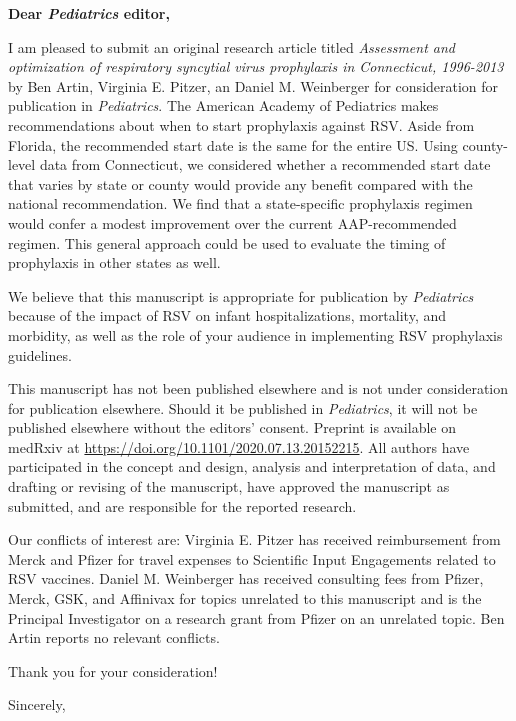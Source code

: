 \documentclass[10pt]{letter} %
\begin{document}

\begin{letter}{} %


\opening{\textbf{Dear \textit{Pediatrics} editor,}}

I am pleased to submit an original research article titled \textit{Assessment and optimization of respiratory syncytial virus prophylaxis in Connecticut, 1996-2013} by Ben Artin, Virginia E. Pitzer, an Daniel M. Weinberger for consideration for publication in \textit{Pediatrics}. The American Academy of Pediatrics makes recommendations about when to start prophylaxis against RSV. Aside from Florida, the recommended start date is the same for the entire US. Using county-level data from Connecticut, we considered whether a recommended start date that varies by state or county would provide any benefit compared with the national recommendation. We find that a state-specific prophylaxis regimen would confer a modest improvement over the current AAP-recommended regimen. This general approach could be used to evaluate the timing of prophylaxis in other states as well.

We believe that this manuscript is appropriate for publication by \textit{Pediatrics} because of the impact of RSV on infant hospitalizations, mortality, and morbidity, as well as the role of your audience in implementing RSV prophylaxis guidelines. 

This manuscript has not been published elsewhere and is not under consideration for publication elsewhere. Should it be published in \textit{Pediatrics}, it will not be published elsewhere without the editors' consent. Preprint is available on medRxiv at \url{https://doi.org/10.1101/2020.07.13.20152215}. All authors have participated in the concept and design, analysis and interpretation of data, and drafting or revising of the manuscript, have approved the manuscript as submitted, and are responsible for the reported research.

Our conflicts of interest are: Virginia E. Pitzer has received reimbursement from Merck and Pfizer for travel expenses to Scientific Input Engagements related to RSV vaccines. Daniel M. Weinberger has received consulting fees from Pfizer, Merck, GSK, and Affinivax for topics unrelated to this manuscript and is the Principal Investigator on a research grant from Pfizer on an unrelated topic. Ben Artin reports no relevant conflicts.

Thank you for your consideration!

\vspace{2\parskip} %
\closing{Sincerely,}
\vspace{2\parskip} %


\end{letter}
 
\end{document}
